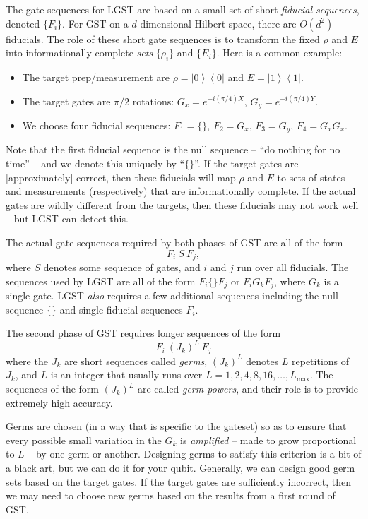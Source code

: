 \documentclass{article}[11pt]
\newcommand{\ket}[1]{\ensuremath{\left|#1\right\rangle}}
\newcommand{\bra}[1]{\ensuremath{\left\langle#1\right|}}
\newcommand{\ketbra}[2]{\ket{#1}\!\!\bra{#2}}
\newcommand{\proj}[1]{\ketbra{#1}{#1}}
\begin{document}
The gate sequences for LGST are based on a small set of short \emph{fiducial sequences}, denoted $\{F_i\}$.  For GST on a $d$-dimensional Hilbert space, there are $O(d^2)$ fiducials.  The role of these short gate sequences is to transform the fixed $\rho$ and $E$ into informationally complete \emph{sets} $\{\rho_i\}$ and $\{E_i\}$.  Here is a common example:
\begin{itemize}
\item The target prep/measurement are $\rho = \proj{0}$ and $E = \proj{1}$.
\item The target gates are $\pi/2$ rotations: $G_x = e^{-i(\pi/4)X}$, $G_y = e^{-i(\pi/4)Y}$.
\item We choose four fiducial sequences: $F_1 = \{\}$, $F_2 = G_x$, $F_3 = G_y$, $F_4 = G_xG_x$.
\end{itemize}
Note that the first fiducial sequence is the null sequence -- ``do nothing for no time'' -- and we denote this uniquely by ``$\{\}$''.  If the target gates are [approximately] correct, then these fiducials will map $\rho$ and $E$ to sets of states and measurements (respectively) that are informationally complete.  If the actual gates are wildly different from the targets, then these fiducials may not work well -- but LGST can detect this.

The actual gate sequences required by both phases of GST are all of the form
\begin{equation}
F_i\ S\ F_j,
\end{equation}
where $S$ denotes some sequence of gates, and $i$ and $j$ run over all fiducials.  The sequences used by LGST are all of the form $F_i\{\}F_j$ or $F_iG_kF_j$, where $G_k$ is a single gate.  LGST \emph{also} requires a few additional sequences including the null sequence $\{\}$ and single-fiducial sequences $F_i$.

The second phase of GST requires longer sequences of the form
\begin{equation}
F_i\ (J_k)^L\ F_j
\end{equation}
where the $J_k$ are short sequences called \emph{germs}, $(J_k)^L$ denotes $L$ repetitions of $J_k$, and $L$ is an integer that usually runs over $L=1,2,4,8,16,\ldots,L_{\mathrm{max}}$.  The sequences of the form $(J_k)^L$ are called \emph{germ powers}, and their role is to provide extremely high accuracy.  

Germs are chosen (in a way that is specific to the gateset) so as to ensure that every possible small variation in the $G_k$ is \emph{amplified} -- made to grow proportional to $L$ -- by one germ or another.  Designing germs to satisfy this criterion is a bit of a black art, but we can do it for your qubit.  Generally, we can design good germ sets based on the target gates.  If the target gates are sufficiently incorrect, then we may need to choose new germs based on the results from a first round of GST.
\end{document}
